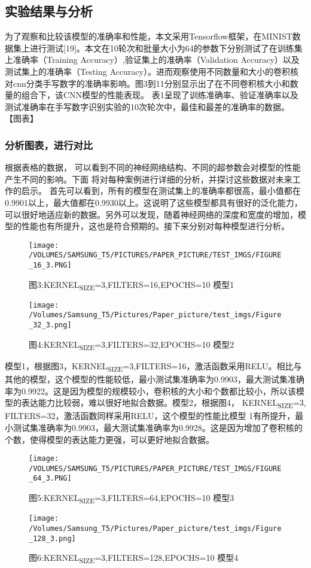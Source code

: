 \documentclass[11pt]{article}
\begin{document}
\subsection{实验结果与分析}
\label{sec:org1f1ddc2}
为了观察和比较该模型的准确率和性能，本文采用Tensorflow框架，在MINIST数据集上进行测试[19]。本文在10轮次和批量大小为64的参数下分别测试了在训练集上准确率（Training Accuracy）,验证集上的准确率（Validation Accuracy）以及测试集上的准确率（Testing Accuracy）。进而观察使用不同数量和大小的卷积核对cnn分类手写数字的准确率影响。图3到11分别显示出了在不同卷积核大小和数量的组合下，该CNN模型的性能表现。
表1呈现了训练准确率、验证准确率以及测试准确率在手写数字识别实验的10次轮次中，最佳和最差的准确率的数据。
【图表】

\subsubsection{分析图表，进行对比}
\label{sec:org831cfcc}
根据表格的数据， 可以看到不同的神经网络结构、不同的超参数会对模型的性能产生不同的影响。下面 将对每种案例进行详细的分析，并探讨这些数据对未来工作的启示。
首先可以看到，所有的模型在测试集上的准确率都很高，最小值都在0.9901以上，最大值都在0.9930以上。这说明了这些模型都具有很好的泛化能力，可以很好地适应新的数据。另外可以发现，随着神经网络的深度和宽度的增加，模型的性能也有所提升，这也是符合预期的。接下来分别对每种模型进行分析。
\begin{figure}[htbp]
\centering
\texttt{[image: /VOLUMES/SAMSUNG\_T5/PICTURES/PAPER\_PICTURE/TEST\_IMGS/FIGURE\_16\_3.PNG]}
\caption{图3:KERNEL\textsubscript{SIZE}=3,FILTERS=16,EPOCHS=10 模型1}
\end{figure}
\begin{figure}[htbp]
\centering
\texttt{[image: /Volumes/Samsung\_T5/Pictures/Paper\_picture/test\_imgs/Figure\_32\_3.png]}
\caption{图4:KERNEL\textsubscript{SIZE}=3,FILTERS=32,EPOCHS=10 模型2}
\end{figure}

模型1，根据图3，KERNEL\textsubscript{SIZE}=3,FILTERS=16，激活函数采用RELU。相比与其他的模型，这个模型的性能较低，最小测试集准确率为0.9903，最大测试集准确率为0.9922。这是因为模型的规模较小，卷积核的大小和个数都比较小，所以该模型的表达能力比较弱，难以很好地拟合数据。模型2，根据图4， KERNEL\textsubscript{SIZE}=3, FILTERS=32，激活函数同样采用RELU，这个模型的性能比模型 1有所提升，最小测试集准确率为0.9903，最大测试集准确率为0.9928。这是因为增加了卷积核的个数，使得模型的表达能力更强，可以更好地拟合数据。
\begin{figure}[htbp]
\centering
\texttt{[image: /VOLUMES/SAMSUNG\_T5/PICTURES/PAPER\_PICTURE/TEST\_IMGS/FIGURE\_64\_3.PNG]}
\caption{图5:KERNEL\textsubscript{SIZE}=3,FILTERS=64,EPOCHS=10 模型3}
\end{figure}
\begin{figure}[htbp]
\centering
\texttt{[image: /Volumes/Samsung\_T5/Pictures/Paper\_picture/test\_imgs/Figure\_128\_3.png]}
\caption{图6:KERNEL\textsubscript{SIZE}=3,FILTERS=128,EPOCHS=10 模型4}
\end{figure}
\end{document}
